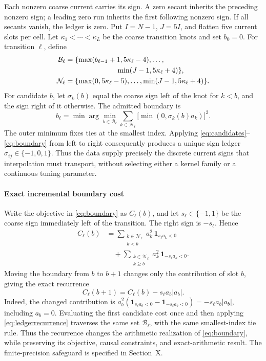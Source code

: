\documentclass[journal]{IEEEtran}
\begin{document}
Each nonzero coarse current carries its sign. A zero secant inherits the
preceding nonzero sign; a leading zero run inherits the first following
nonzero sign. If all secants vanish, the ledger is zero. Put \(I=N-1\),
\(J=5I\), and flatten five current slots per cell. Let
\(\kappa_1<\cdots<\kappa_L\) be the coarse transition knots and set
\(b_0=0\). For transition \(\ell\), define
\begin{align}
\mathcal B_\ell
 &=\{\max(b_{\ell-1}+1,5\kappa_\ell-4),\ldots,\nonumber\\
 &\hspace{25mm}\min(J-1,5\kappa_\ell+4)\},\label{eq:candidates}\\
\mathcal N_\ell
 &=\{\max(0,5\kappa_\ell-5),\ldots,
\min(J-1,5\kappa_\ell+4)\}.\label{eq:window}
\end{align}
For candidate \(b\), let \(\sigma_k(b)\) equal the coarse sign left of the
knot for \(k<b\), and the sign right of it otherwise. The admitted boundary
is
\begin{equation}
 b_\ell=\min\arg\min_{b\in\mathcal B_\ell}
 \sum_{k\in\mathcal N_\ell}\bigl[\min(0,\sigma_k(b)a_k)\bigr]^2.
 \label{eq:boundary}
\end{equation}
The outer minimum fixes ties at the smallest index. Applying
\eqref{eq:candidates}--\eqref{eq:boundary} from left to right consequently
produces a unique sign ledger \(\sigma_{ij}\in\{-1,0,1\}\). Thus the data
supply precisely the discrete current signs that interpolation must
transport, without selecting either a kernel family or a continuous tuning
parameter.

\paragraph{Exact incremental boundary cost}
Write the objective in \eqref{eq:boundary} as \(C_\ell(b)\), and let
\(s_\ell\in\{-1,1\}\) be the coarse sign immediately left of the
transition. The right sign is \(-s_\ell\). Hence
\begin{align}
 C_\ell(b)
 &=\sum_{\substack{k\in\mathcal N_\ell\\k<b}}
 a_k^2\,\mathbf1_{s_\ell a_k<0}\nonumber\\
 &\quad+\sum_{\substack{k\in\mathcal N_\ell\\k\ge b}}
 a_k^2\,\mathbf1_{-s_\ell a_k<0}.
 \label{eq:ledgercostexplicit}
\end{align}
Moving the boundary from \(b\) to \(b+1\) changes only the contribution
of slot \(b\), giving the exact recurrence
\begin{equation}
 \boxed{C_\ell(b+1)=C_\ell(b)-s_\ell a_b|a_b|.}
 \label{eq:ledgerrecurrence}
\end{equation}
Indeed, the changed contribution is
\(a_b^2(\mathbf1_{s_\ell a_b<0}-\mathbf1_{-s_\ell a_b<0})
=-s_\ell a_b|a_b|\), including \(a_b=0\). Evaluating the first
candidate cost once and then applying \eqref{eq:ledgerrecurrence} traverses
the same set \(\mathcal B_\ell\), with the same smallest-index tie rule.
Thus the recurrence changes the arithmetic realization of
\eqref{eq:boundary}, while preserving its objective, causal constraints,
and exact-arithmetic result. The finite-precision safeguard is specified
in Section~X.
\end{document}
